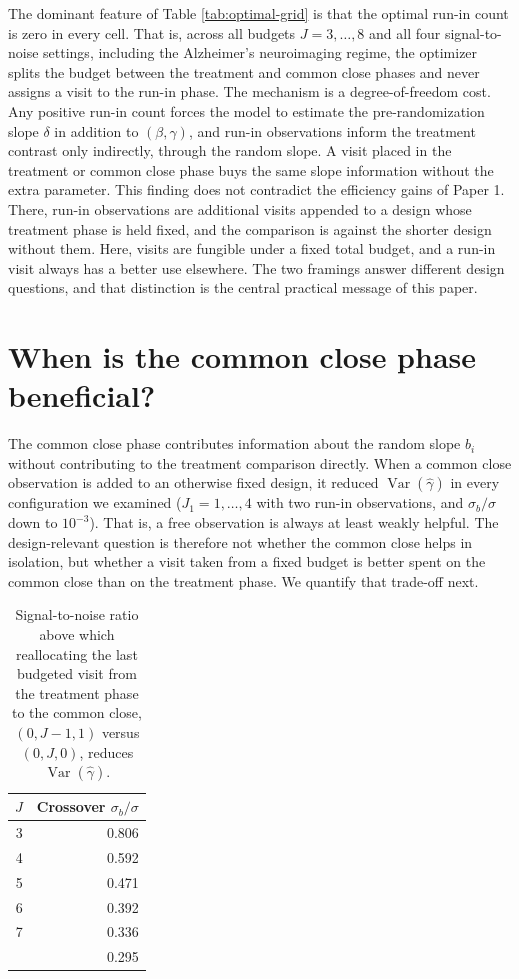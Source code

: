 \documentclass[
  11pt,
]{article}
\begin{document}
The dominant feature of Table \ref{tab:optimal-grid} is
that the optimal run-in count is zero in every cell. That
is, across all budgets \(J = 3, \ldots, 8\) and all four
signal-to-noise settings, including the Alzheimer's
neuroimaging regime, the optimizer splits the budget
between the treatment and common close phases and never
assigns a visit to the run-in phase. The mechanism is a
degree-of-freedom cost. Any positive run-in count forces
the model to estimate the pre-randomization slope
\(\delta\) in addition to \((\beta, \gamma)\), and run-in
observations inform the treatment contrast only
indirectly, through the random slope. A visit placed in
the treatment or common close phase buys the same slope
information without the extra parameter. This finding
does not contradict the efficiency gains of Paper 1.
There, run-in observations are additional visits appended
to a design whose treatment phase is held fixed, and the
comparison is against the shorter design without them.
Here, visits are fungible under a fixed total budget, and
a run-in visit always has a better use elsewhere. The two
framings answer different design questions, and that
distinction is the central practical message of this
paper.

\section{When is the common close phase beneficial?}\label{when-is-the-common-close-phase-beneficial}

The common close phase contributes information about
the random slope \(b_i\) without contributing to the
treatment comparison directly. When a common close
observation is added to an otherwise fixed design, it
reduced \(\mathop{\mathrm{Var}}(\hat\gamma)\) in every configuration we
examined (\(J_1 = 1, \ldots, 4\) with two run-in
observations, and \(\sigma_b/\sigma\) down to \(10^{-3}\)).
That is, a free observation is always at least weakly
helpful. The design-relevant question is therefore not
whether the common close helps in isolation, but whether
a visit taken from a fixed budget is better spent on the
common close than on the treatment phase. We quantify
that trade-off next.

\begin{table}

\caption{\label{tab:common-close-crossover}Signal-to-noise ratio above which reallocating the last budgeted visit from the treatment phase to the common close, $(0, J-1, 1)$ versus $(0, J, 0)$, reduces $\mathop{\mathrm{Var}}(\hat\gamma)$.}
\centering
\begin{tabular}[t]{rr}
\toprule
$J$ & Crossover $\sigma_b/\sigma$\\
\midrule
3 & 0.806\\
4 & 0.592\\
5 & 0.471\\
6 & 0.392\\
7 & 0.336\\
\addlinespace
8 & 0.295\\
\bottomrule
\end{tabular}
\end{table}
\end{document}
